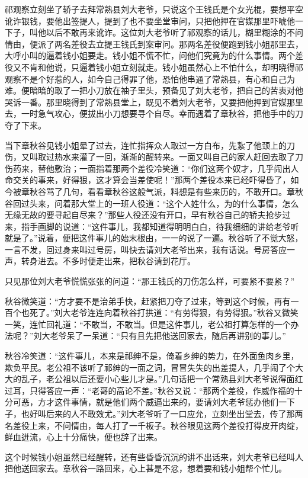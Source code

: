 \documentclass[12pt,UTF8]{ctexbook}
\begin{document}
{{{祁观察立刻坐了轿子去拜常熟县刘大老爷，只说这个王钱氏是个女光棍，要想平空讹诈银钱，要他出签提人，提到了也不要坐堂审问，只把他押在官媒那里吓唬他一下子，叫他以后不敢再来讹诈。这位刘大老爷听了祁观察的话儿，糊里糊涂的不问情由，便派了两名差役去立提王钱氏到案审问。那两名差役便跑到钱小姐那里去，大呼小叫的逼着钱小姐要走。钱小姐不慌不忙，问他们究竟为的什么事情。两个差役又不肯和他说，只逼着钱小姐立刻就走。钱小姐虽然心上不怕什么，却明晓得祁观察不是个好惹的人，如今自己得罪了他，恐怕他串通了常熟县，有心和自己为难。便暗暗的取了一把小刀放在袖子里头，预备见了刘大老爷，把自己的苦衷对他哭诉一番。那里晓得到了常熟县堂上，既见不着刘大老爷，又要把他押到官媒那里去，一时急气攻心，便拔出小刀想要寻个自尽。幸而遇着了章秋谷，把他手中的刀夺了下来。

当下章秋谷见钱小姐晕了过去，连忙指挥众人取过一方白布，先紥了他颈上的刀伤，又叫取过热水来灌了一回，渐渐的醒转来。一面又叫自己的家人赶回去取了刀伤药来，替他敷治；一面指着那两个差役冷笑道：“你们这两个奴才，几乎闹出人命交关的事来，好得狠，这才算会当差使呢！”那两个差役本来已经吓得昏了，如今被章秋谷骂了几句，看看章秋谷这般气派，料想是有些来历的，不敢开口。章秋谷回过头来，问着那大堂上的一班人役道：“这个人姓什么，为的什么事情，怎么无缘无故的要寻起自尽来？”那些人役还没有开口，早有秋谷自己的轿夫抢步过来，指手画脚的说道：“这件事儿，我都知道得明明白白，待我细细的讲给老爷听就是了。”说着，便把这件事儿的始末根由，一一的说了一遍。秋谷听了不觉大怒，一言不发，回过身来叫过号房，叫快去请刘大老爷出来，我有话说。号房答应一声，转身进去。不多时便走出来，把秋谷请到花厅。

只见那位刘大老爷慌慌张张的问道：“那王钱氏的刀伤怎么样，可要紧不要紧？”

秋谷微笑道：“方才要不是治弟手快，赶紧把刀夺了过来，等到这个时候，再有一百个也死了。”刘大老爷连连向着秋谷打拱道：“有劳得狠，有劳得狠。”秋谷又微笑一笑，连忙回礼道：“不敢当，不敢当。但是这件事儿，老公祖打算怎样的一个办法呢？”刘大老爷呆了一呆道：“只有且先把他送回家去，随后再讲别的事儿。”

秋谷冷笑道：“这件事儿，本来是祁绅不是，倚着乡绅的势力，在外面鱼肉乡里，欺负平民。老公祖不该听了祁绅的一面之词，冒冒失失的出差提人，几乎闹了个大大的乱子，老公祖以后还要小心些儿才是。”几句话把一个常熟县刘大老爷说得面红过耳，只得答应一声：“老哥的高论不差。”秋谷又说：“那两个差役，作威作福的十分可恶，方才这件事情，就是他们两个威逼出来的，要请刘大老爷惩办他们一下子，也好叫后来的人不敢效尤。”刘大老爷听了一口应允，立刻坐出堂去，传了那两名差役上来，不问情由，每人打了一千板子。秋谷眼见这两个差役打得皮开肉绽，鲜血迸流，心上十分痛快，便也辞了出来。

这个时候钱小姐虽然已经醒转，还有些昏昏沉沉的讲不出话来，刘大老爷已经叫人把他送回家去。章秋谷一路回来，心上甚是不忿，想着要和钱小姐帮个忙儿。

}}}
\end{document}
